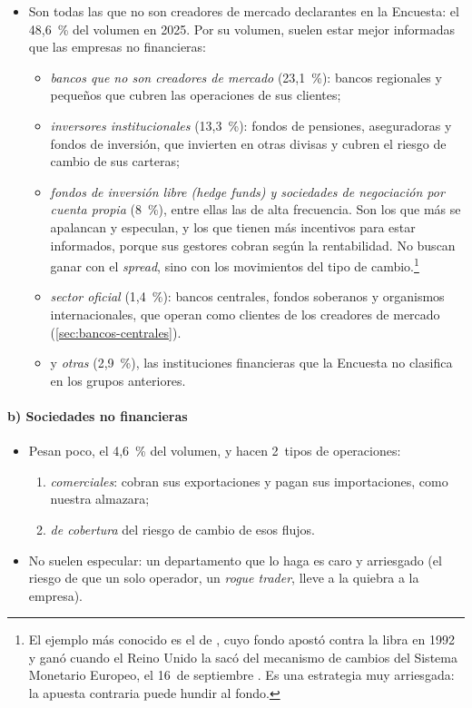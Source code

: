 \documentclass[11pt]{article}
\begin{document}
\begin{itemize}
\item Son todas las que no son creadores de mercado declarantes en la Encuesta: el 48,6~\% del volumen en 2025\nocite{BIS2026TrienalDatos}. Por su volumen, suelen estar mejor informadas que las empresas no financieras:
  \begin{itemize}
  \item \emph{bancos que no son creadores de mercado} (23,1~\%): bancos regionales y pequeños que cubren las operaciones de sus clientes;
  \item \emph{inversores institucionales} (13,3~\%): fondos de pensiones, aseguradoras y fondos de inversión, que invierten en otras divisas y cubren el riesgo de cambio de sus carteras;
  \item \emph{fondos de inversión libre (hedge funds) y sociedades de negociación por cuenta propia} (8~\%), entre ellas las de alta frecuencia. Son los que más se apalancan y especulan, y los que tienen más incentivos para estar informados, porque sus gestores cobran según la rentabilidad. No buscan ganar con el \emph{spread}, sino con los movimientos del tipo de cambio.\footnote{El ejemplo más conocido es el de , cuyo fondo apostó contra la libra en 1992 y ganó cuando el Reino Unido la sacó del mecanismo de cambios del Sistema Monetario Europeo, el 16~de septiembre . Es una estrategia muy arriesgada: la apuesta contraria puede hundir al fondo.}
  \item \emph{sector oficial} (1,4~\%): bancos centrales, fondos soberanos y organismos internacionales, que operan como clientes de los creadores de mercado (\ref{sec:bancos-centrales}).
  \item y \emph{otras} (2,9~\%), las instituciones financieras que la Encuesta no clasifica en los grupos anteriores.
  \end{itemize}
\end{itemize}

\paragraph{b) Sociedades no financieras}

\begin{itemize}
\item Pesan poco, el 4,6~\% del volumen\nocite{BIS2026TrienalDatos}, y hacen 2~tipos de operaciones:
  \begin{enumerate}
  \item \emph{comerciales}: cobran sus exportaciones y pagan sus importaciones, como nuestra almazara;
  \item \emph{de cobertura} del riesgo de cambio de esos flujos.
  \end{enumerate}
\item No suelen especular: un departamento que lo haga es caro y arriesgado (el riesgo de que un solo operador, un \emph{rogue trader}, lleve a la quiebra a la empresa).
\end{itemize}
\end{document}

